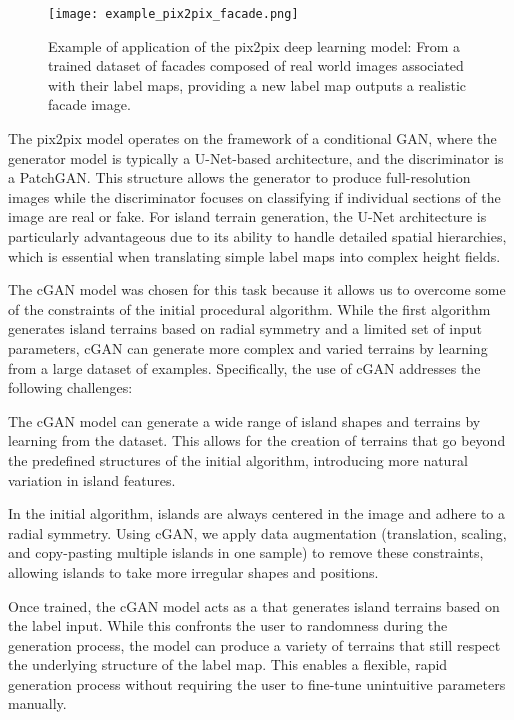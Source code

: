 \begin{figure}[H]
	\centering
	\texttt{[image: example\_pix2pix\_facade.png]}
    \caption{Example of application of the pix2pix deep learning model: From a trained dataset of facades composed of real world images associated with their label maps, providing a new label map outputs a realistic facade image. }
    \label{fig:coral-island_pix2pix-example}
\end{figure}




The pix2pix model operates on the framework of a conditional GAN, where the generator model is typically a U-Net-based architecture, and the discriminator is a PatchGAN. This structure allows the generator to produce full-resolution images while the discriminator focuses on classifying if individual sections of the image are real or fake. For island terrain generation, the U-Net architecture is particularly advantageous due to its ability to handle detailed spatial hierarchies, which is essential when translating simple label maps into complex height fields. 



The cGAN model was chosen for this task because it allows us to overcome some of the constraints of the initial procedural algorithm. While the first algorithm generates island terrains based on radial symmetry and a limited set of input parameters, cGAN can generate more complex and varied terrains by learning from a large dataset of examples. Specifically, the use of cGAN addresses the following challenges:
\begin{Itemize}
     The cGAN model can generate a wide range of island shapes and terrains by learning from the dataset. This allows for the creation of terrains that go beyond the predefined structures of the initial algorithm, introducing more natural variation in island features.

     In the initial algorithm, islands are always centered in the image and adhere to a radial symmetry. Using cGAN, we apply data augmentation (translation, scaling, and copy-pasting multiple islands in one sample) to remove these constraints, allowing islands to take more irregular shapes and positions.

     Once trained, the cGAN model acts as a  that generates island terrains based on the label input. While this confronts the user to randomness during the generation process, the model can produce a variety of terrains that still respect the underlying structure of the label map. This enables a flexible, rapid generation process without requiring the user to fine-tune unintuitive parameters manually.
\end{Itemize}

